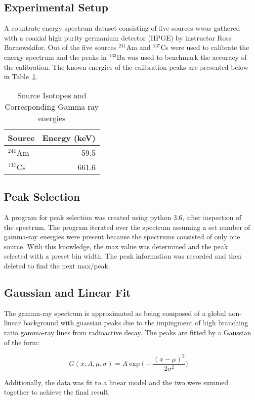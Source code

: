 \subsection{Experimental Setup}
A countrate energy spectrum dataset consisting of  five sources wwas gathered with a coaxial high purity germanium detector (HPGE) by instructor Ross Barnowskifor. Out of the five sources $^{241}$Am and $^{137}$Cs were used to calibrate the energy spectrum and the peaks in $^{133}$Ba was used to benchmark the accuracy of the calibration. The known energies of the calibration peaks are presented below in Table~\ref{tab:CalSrc}.

\begin{table}[H]
        \begin{center}
                \begin{tabular}{l|r}
                        \textbf{Source} & \textbf{Energy (keV)}\\
                        \hline
                        $^{241}$Am      &       59.5    \\
                        $^{137}$Cs      &       661.6   \\
                \end{tabular}
                \caption{Source Isotopes and Corresponding Gamma-ray energies}
                \label{tab:CalSrc}
        \end{center}
\end{table}

\subsection{Peak Selection}
	
	A program for peak selection was created using python 3.6, after inspection of the spectrum. The program iterated over the spectrum assuming a set number of gamma-ray energies were present because the spectrums consisted of only one source. With this knowledge, the max value was determined and the peak selected with a preset bin width. The peak information was recorded and then deleted to find the next max/peak.  

\subsection{Gaussian and Linear Fit}

        The gamma-ray spectrum is approximated as being composed of a global non-linear background with guassian peaks due to the impingment of high branching ratio gamma-ray lines from radioactive decay.\cite{Knoll} The peaks are fitted by a Gaussian of the form:

\begin{equation}
G(x; A,\mu, \sigma) = A\exp\bigg(-\frac{(x-\mu)^2}{2\sigma^2}\bigg)
\end{equation}

Additionally, the data was fit to a linear model and the two were summed together to achieve the final result. 



